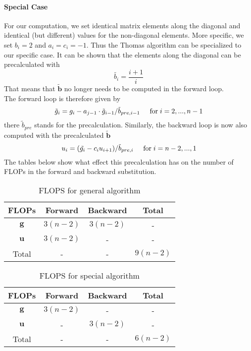 \documentclass[%
oneside,                 %
final,                   %
10pt]{article}
\begin{document}
\paragraph{Special Case}
For our computation, we set identical matrix elements along the diagonal and identical (but different) values for the non-diagonal elements. More specific, we set $b_i = 2$ and $a_i = c_i = -1$. Thus the Thomas algorithm can be specialized to our specific case. It can be shown that the elements along the diagonal can be precalculated with
\begin{equation*}
\tilde{b_i} = \frac{i+1}{i}
\end{equation*}
That means that $\mathbf{\tilde{b}}$ no longer needs to be computed in the forward loop. \\
The forward loop is therefore given by
\begin{equation*}
\tilde{g}_i = g_i - a_{j-1} \cdot \tilde{g}_{i-1} / \tilde{b}_{pre, i-1}  \hspace{0.5cm} \mathrm{for} \hspace{0.1cm} i=2,..., n-1 \\
\end{equation*}
there $\tilde{b}_{pre}$ stands for the precalculation.
Similarly, the backward loop is now also computed with the precalculated $\mathbf{\tilde{b}}$
\begin{equation*}
u_i = ( \tilde{g_i}-c_i u_{i+1} )/ \tilde{b}_{pre,i} \hspace{0.5cm} \mathrm{for} \hspace{0.1cm} i=n-2,...,1
\end{equation*}
The tables below show what effect this precalculation has on the number of FLOPs in the forward and backward substitution.

\begin{table}[ht]
\caption{FLOPS for general algorithm}
\centering
	\begin{tabular}{c c c c}
		\hline
		FLOPs   & Forward & Backward & Total \\ [0.5ex]
		\hline
		$\mathbf{g}$ & $3 (n-2)$       & $3 (n-2)$        & -    \\
        	$\mathbf{u}$ & $3 (n-2)$       & -        & -     \\
        	Total        & -       & -        &  $9 (n-2)$      \\ [1ex]
		\hline
	\end{tabular}
\end{table}

\begin{table}[ht]
\caption{FLOPS for special algorithm}
\centering
	\begin{tabular}{c c c c}
		\hline
		FLOPs   & Forward & Backward & Total \\ [0.5ex]
		\hline
		$\mathbf{g}$ & $3 (n-2)$       & -        & -    \\
        	$\mathbf{u}$ & -       & $3 (n-2)$        & -     \\
        	Total        & -       & -        & $6 (n-2)$      \\ [1ex]
		\hline
	\end{tabular}
\end{table}
\end{document}
